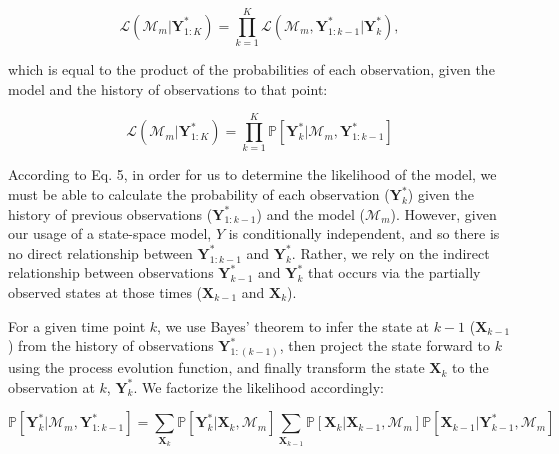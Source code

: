 \documentclass{article}
\begin{document}
\begin{equation}
\mathcal{L}(\mathcal{M}_m|\textbf{Y}^{*}_{1:K}) = \prod_{k = 1}^{K}{\mathcal{L}(\mathcal{M}_m, \textbf{Y}^{*}_{1:k-1}|\textbf{Y}^{*}_{k})},
\end{equation}

which is equal to the product of the probabilities of each observation, given the model and the history of observations to that point:

\begin{equation}
\mathcal{L}(\mathcal{M}_m|\textbf{Y}^{*}_{1:K}) = \prod_{k = 1}^{K}{\mathbb{P}[\textbf{Y}^{*}_{k}|\mathcal{M}_m, \textbf{Y}^{*}_{1:k-1}]}
\end{equation}

According to Eq. 5, in order for us to determine the likelihood of the model, we must be able to calculate the probability of each observation ($\textbf{Y}^{*}_{k}$) given the history of previous observations ($\textbf{Y}^{*}_{1:k-1}$) and the model ($\mathcal{M}_m$). However, given our usage of a state-space model, $Y$ is conditionally independent, and so there is no direct relationship between $\textbf{Y}^{*}_{1:k-1}$ and $\textbf{Y}^{*}_{k}$. Rather, we rely on the indirect relationship between  observations $\textbf{Y}^{*}_{k-1}$ and $\textbf{Y}^{*}_{k}$ that occurs via the partially observed states at those times ($\textbf{X}_{k-1}$ and $\textbf{X}_{k}$). 

For a given time point $k$, we use Bayes' theorem  to infer the state at $k-1$ ($\textbf{X}_{k-1}$) from the history of observations $\textbf{Y}^{*}_{1:(k-1)}$, then project the state forward to $k$ using the process evolution function, and finally transform the state $\textbf{X}_{k}$ to the observation at $k$, $\textbf{Y}^{*}_{k}$. We factorize the likelihood accordingly:

\begin{equation}
\mathbb{P}[\textbf{Y}^{*}_{k}|\mathcal{M}_m, \textbf{Y}^{*}_{1:k-1}] = \sum_{\textbf{X}_k}{\mathbb{P}[\textbf{Y}^*_k|\textbf{X}_k, \mathcal{M}_m]}\sum_{\textbf{X}_{k-1}}{\mathbb{P}[\textbf{X}_k|\textbf{X}_{k-1}, \mathcal{M}_m]\mathbb{P}[\textbf{X}_{k-1}|\textbf{Y}^*_{k-1}, \mathcal{M}_m]}
\end{equation}





  
\end{document}
